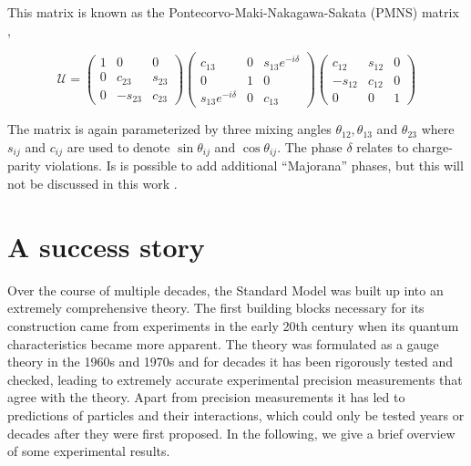 \noindent This matrix is known as the Pontecorvo-Maki-Nakagawa-Sakata (PMNS) matrix \cite{doi:10.1143/PTP.28.870},

\begin{equation}
\mathcal{U} = \begin{pmatrix}
1 	& 0 		& 0 \\
0 	& c_{23}	& s_{23} \\
0	& -s_{23} 	& c_{23}
\end{pmatrix}
\begin{pmatrix}
c_{13} 				& 0 		& s_{13}e^{-i\delta} \\
0 					& 1			& 0 \\
s_{13}e^{-i\delta}	& 0 		& c_{13}
\end{pmatrix}
\begin{pmatrix}
c_{12} 	& s_{12}	& 0 \\
-s_{12} & c_{12}	& 0 \\
0		& 0			& 1
\end{pmatrix}
\end{equation}

\noindent The matrix is again parameterized by three mixing angles $\theta_{12}, \theta_{13}$ and $\theta_{23}$ where $s_{ij}$ and $c_{ij}$ are used to denote $\sin\theta_{ij}$ and $\cos\theta_{ij}$. The phase $\delta$ relates to charge-parity violations. Is is possible to add additional ``Majorana'' phases, but this will not be discussed in this work \cite{Giganti:2017fhf}.
 
\section{A success story}
Over the course of multiple decades, the Standard Model was built up into an extremely comprehensive theory. The first building blocks necessary for its construction came from experiments in the early 20th century when its quantum characteristics became more apparent. The theory was formulated as a gauge theory in the 1960s and 1970s and for decades it has been rigorously tested and checked, leading to extremely accurate experimental precision measurements that agree with the theory. Apart from precision measurements it has led to predictions of particles and their interactions, which could only be tested years or decades after they were first proposed. In the following, we give a brief overview of some experimental results.

\iffalse
